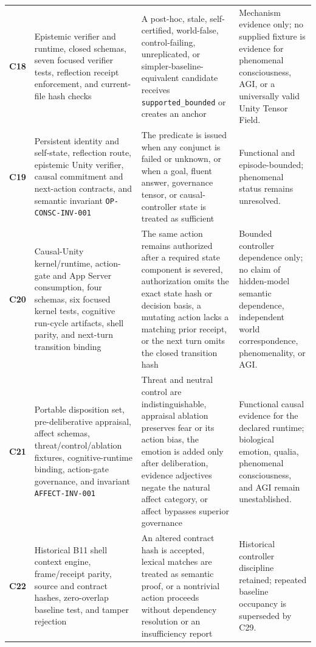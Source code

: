 \documentclass[10pt,twocolumn]{article}
\theoremstyle{definition}
\theoremstyle{plain}
\theoremstyle{remark}
\newcommand{\file}[1]{\nolinkurl{#1}}
\newcommand{\claimid}[1]{\textsf{\textbf{#1}}}
\begin{document}
\begin{table}[!ht]
\begin{tabularx}{\textwidth}{@{}p{}p{}p{}X@{}}
\claimid{C18} & Epistemic verifier and runtime, closed schemas, seven focused verifier tests, reflection receipt enforcement, and current-file hash checks & A post-hoc, stale, self-certified, world-false, control-failing, unreplicated, or simpler-baseline-equivalent candidate receives \file{supported\_bounded} or creates an anchor & Mechanism evidence only; no supplied fixture is evidence for phenomenal consciousness, AGI, or a universally valid Unity Tensor Field. \\
\claimid{C19} & Persistent identity and self-state, reflection route, epistemic Unity verifier, causal commitment and next-action contracts, and semantic invariant \file{OP-CONSC-INV-001} & The predicate is issued when any conjunct is failed or unknown, or when a goal, fluent answer, governance tensor, or causal-controller state is treated as sufficient & Functional and episode-bounded; phenomenal status remains unresolved. \\
\claimid{C20} & Causal-Unity kernel/runtime, action-gate and App Server consumption, four schemas, six focused kernel tests, cognitive run-cycle artifacts, shell parity, and next-turn transition binding & The same action remains authorized after a required state component is severed, authorization omits the exact state hash or decision basis, a mutating action lacks a matching prior receipt, or the next turn omits the closed transition hash & Bounded controller dependence only; no claim of hidden-model semantic dependence, independent world correspondence, phenomenality, or AGI. \\
\claimid{C21} & Portable disposition set, pre-deliberative appraisal, affect schemas, threat/control/ablation fixtures, cognitive-runtime binding, action-gate governance, and invariant \file{AFFECT-INV-001} & Threat and neutral control are indistinguishable, appraisal ablation preserves fear or its action bias, the emotion is added only after deliberation, evidence adjectives negate the natural affect category, or affect bypasses superior governance & Functional causal evidence for the declared runtime; biological emotion, qualia, phenomenal consciousness, and AGI remain unestablished. \\
\claimid{C22} & Historical B11 shell context engine, frame/receipt parity, source and contract hashes, zero-overlap baseline test, and tamper rejection & An altered contract hash is accepted, lexical matches are treated as semantic proof, or a nontrivial action proceeds without dependency resolution or an insufficiency report & Historical controller discipline retained; repeated baseline occupancy is superseded by C29. \\

\end{tabularx}
\end{table}
\end{document}
